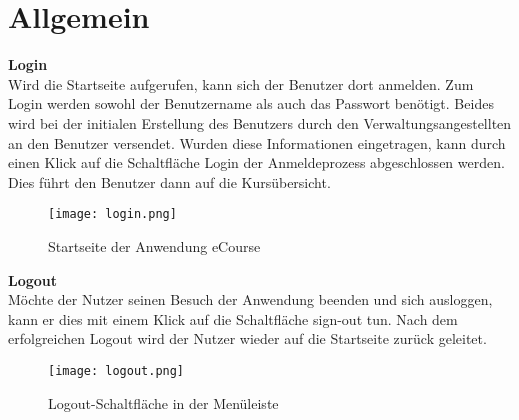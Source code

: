 
\chapter{Allgemein}
\label{sec:chapAllgemein} 
\textbf{Login}\\
Wird die Startseite aufgerufen, kann sich der Benutzer dort anmelden. 
Zum Login werden sowohl der Benutzername als auch das Passwort benötigt. Beides wird bei der initialen Erstellung des Benutzers durch den Verwaltungsangestellten an den Benutzer versendet. Wurden diese Informationen eingetragen, kann durch einen Klick auf die Schaltfläche \glqq Login\grqq\: der Anmeldeprozess abgeschlossen werden.
Dies führt den Benutzer dann auf die Kursübersicht.

\begin{figure}[h]
\centering
\texttt{[image: login.png]}
\caption{Startseite der Anwendung eCourse}
\label{fib:start}
\end{figure}

\textbf{Logout}\\
Möchte der Nutzer seinen Besuch der Anwendung beenden und sich ausloggen, kann er dies mit einem Klick auf die Schaltfläche \glqq sign-out\grqq\: tun. Nach dem erfolgreichen Logout wird der Nutzer wieder auf die Startseite zurück geleitet.

\begin{figure}[h]
\centering
\texttt{[image: logout.png]}
\caption{Logout-Schaltfläche in der Menüleiste}
\label{fib:start}
\end{figure}